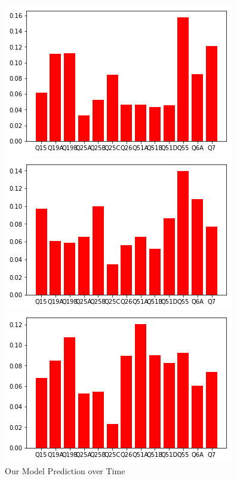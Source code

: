 {\begin{figure}[t!]
\caption{Our Model Prediction over Time}
	\label{fig:groundtruth}
	\begin{minipage}{0.24\textwidth}
		\includegraphics[width=\linewidth]{Images/pred_2005.png}
	\end{minipage}\hfill
	\begin{minipage}{0.24\textwidth}
		\includegraphics[width=\linewidth]{Images/pred_2008.png}
	\end{minipage}\hfill
	\begin{minipage}{0.24\textwidth}%
		\includegraphics[width=\linewidth]{Images/pred_2011.png}

\end{minipage}
\end{figure}}
